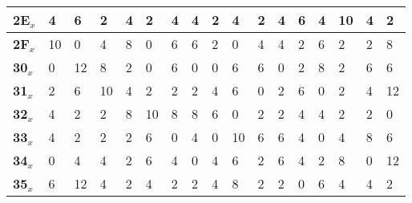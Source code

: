 \begin{longtable}[c]{|l|l|l|l|l|l|l|l|l|l|l|l|l|l|l|l|l|}
\textbf{2E$_x$} & 4              & 6              & 2              & 4              & 2              & 4              & 4              & 2              & 4              & 2              & 4              & 6              & 4              & 10             & 4              & 2              \\ \hline
\textbf{2F$_x$} & 10             & 0              & 4              & 8              & 0              & 6              & 6              & 2              & 0              & 4              & 4              & 2              & 6              & 2              & 2              & 8              \\ \hline
\textbf{30$_x$} & 0              & 12             & 8              & 2              & 0              & 6              & 0              & 0              & 6              & 6              & 0              & 2              & 8              & 2              & 6              & 6              \\ \hline
\textbf{31$_x$} & 2              & 6              & 10             & 4              & 2              & 2              & 2              & 4              & 6              & 0              & 2              & 6              & 0              & 2              & 4              & 12             \\ \hline
\textbf{32$_x$} & 4              & 2              & 2              & 8              & 10             & 8              & 8              & 6              & 0              & 2              & 2              & 4              & 4              & 2              & 2              & 0              \\ \hline
\textbf{33$_x$} & 4              & 2              & 2              & 2              & 6              & 0              & 4              & 0              & 10             & 6              & 6              & 4              & 0              & 4              & 8              & 6              \\ \hline
\textbf{34$_x$} & 0              & 4              & 4              & 2              & 6              & 4              & 0              & 4              & 6              & 2              & 6              & 4              & 2              & 8              & 0              & 12             \\ \hline
\textbf{35$_x$} & 6              & 12             & 4              & 2              & 4              & 2              & 2              & 4              & 8              & 2              & 2              & 0              & 6              & 4              & 4              & 2              \\ \hline

\end{longtable}

